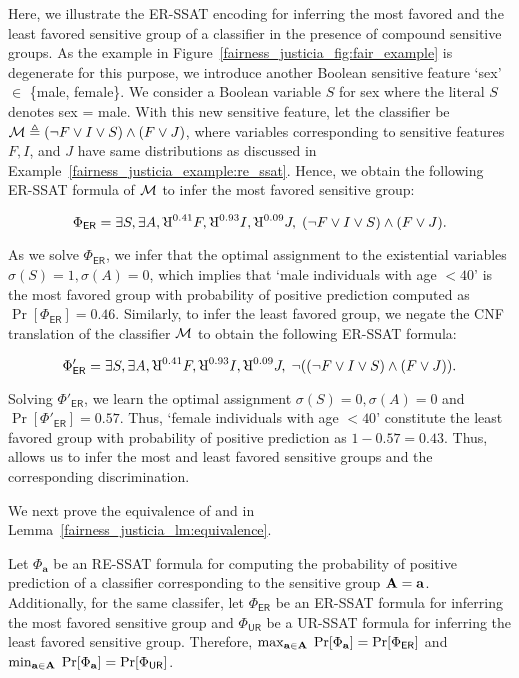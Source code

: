 \begin{example}
	\normalfont
	\label{fairness_justicia_example:er_ssat}
	Here, we illustrate the ER-SSAT encoding for inferring the most favored and the least favored sensitive group of a classifier in the presence of compound sensitive groups. As the example in Figure~\ref{fairness_justicia_fig:fair_example} is degenerate for this purpose, we introduce another Boolean sensitive feature `sex' $ \in $ \{male, female\}. We consider a Boolean variable $ S $ for sex where the literal $ S $ denotes sex = male. With this new sensitive feature, let the classifier be  $\mathcal{M} \triangleq (\neg F \vee I \vee S) \wedge (F \vee J)$, where variables corresponding to sensitive features $ F,I$, and  $J $ have same distributions as discussed in Example~\ref{fairness_justicia_example:re_ssat}. Hence, we obtain the following ER-SSAT formula of $\mathcal{M}$ to infer the most favored sensitive group:
	
	\[ \Phi_{\mathsf{ER}} =  \exists S,\exists A, \R^{0.41}F, \R^{0.93}I, \R^{0.09}J, \; (\neg F \vee I \vee S) \wedge (F \vee J).
	\]
	
	As we solve $ \Phi_{\mathsf{ER}} $, we infer that the optimal assignment to the existential variables $ \sigma(S) = 1, \sigma(A) = 0$, which implies that `male individuals with age $ < 40 $' is the most favored group with probability of positive prediction computed as $ \Pr[\Phi_{\mathsf{ER}}] = 0.46$. Similarly, to infer the least favored group, we negate the CNF translation of the classifier $\mathcal{M}$ to obtain the following ER-SSAT formula:
	
	\[\Phi'_{\mathsf{ER}} =  \exists S, \exists A, \R^{0.41}F, \R^{0.93}I, \R^{0.09}J, \; \neg((\neg F \vee I \vee S) \wedge (F \vee J)).
	\]
	
	Solving $ \Phi'_{\mathsf{ER}} $, we learn the optimal assignment $ \sigma(S) = 0, \sigma(A) = 0  $ and $  \Pr[\Phi'_{\mathsf{ER}}] = 0.57 $. Thus, `female individuals with age $ < 40 $' constitute the least favored group with probability of positive prediction as  $ 1-0.57 = 0.43$. 
	Thus, {\justicialearn} allows us to infer the most and least favored sensitive groups and the corresponding discrimination.
\end{example}



We next prove the equivalence of {\justiciaenum} and {\justicialearn} in Lemma~\ref{fairness_justicia_lm:equivalence}.

\begin{lemma}
	\label{fairness_justicia_lm:equivalence}
	Let $ \Phi_{\mathbf{a}} $ be an RE-SSAT formula for computing the probability of positive prediction of a classifier corresponding to the sensitive group $  \mathbf{A} = \mathbf{a} $. Additionally, for the same classifer, let $ \Phi_{\mathsf{ER}} $ be an ER-SSAT formula for inferring the most favored sensitive group and $ \Phi_{\mathsf{UR}} $ be a UR-SSAT formula for inferring the least favored sensitive group.  Therefore,	$\max_{\mathbf{a} \in \mathbf{A}} \; \Pr[\Phi_{\mathbf{a}}] = \Pr[\Phi_{\mathsf{ER}}]$   	and	$\min_{\mathbf{a} \in \mathbf{A}} \; \Pr[\Phi_{\mathbf{a}}] = \Pr[\Phi_{\mathsf{UR}}]$.  
\end{lemma}

